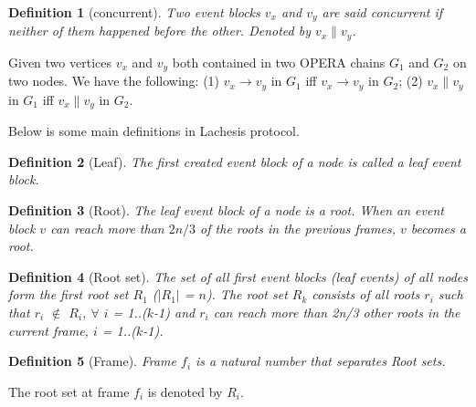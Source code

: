 \documentclass{article}
\newtheorem{defn}{Definition}[section]
\newcommand{\hbefore}{\rightarrow}
\newcommand{\concur}{\parallel}
\begin{document}


\begin{defn}[concurrent]
	Two event blocks $v_x$ and $v_y$ are said concurrent if neither of them  happened before the other. Denoted by $v_x \concur v_y$.
\end{defn}


Given two vertices $v_x$ and $v_y$ both contained in two OPERA chains $G_1$ and $G_2$ on two nodes. We have the following: 
	(1) $v_x \hbefore v_y$ in $G_1$ iff $v_x \hbefore v_y$ in $G_2$; (2)
	$v_x \concur v_y$ in $G_1$ iff $v_x \concur v_y$ in $G_2$.


Below is some main definitions in Lachesis protocol.
\begin{defn}[Leaf]
	The first created event block of a node is called a leaf event block.
\end{defn}

\begin{defn}[Root]
\label{def:root}
	The leaf event block of a node is a root.
	When an event block $v$ can reach more than $2n/3$ of the roots in the previous frames, $v$ becomes a root.
\end{defn}

\begin{defn}[Root set]
	The set of all first event blocks (leaf events) of all nodes form the first root set $R_1$ ($|R_1|$ = $n$). The root set $R_k$ consists of all roots $r_i$ such that $r_i$ $\not \in $ $R_i$, $\forall$ $i$ = 1..($k$-1) and $r_i$ can reach more than 2n/3 other roots in the current frame, $i$ = 1..($k$-1).  
\end{defn}

\begin{defn}[Frame]
Frame $f_i$ is a natural number that separates Root sets. 
\end{defn} 

The root set at frame $f_i$ is denoted by $R_i$.
\end{document}
